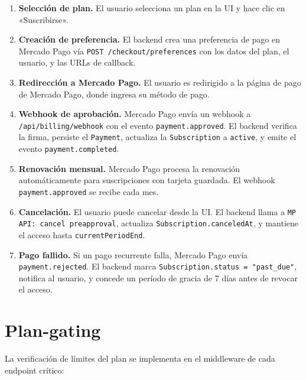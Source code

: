 \documentclass[10pt,a4paper,oneside]{report}
\begin{document}
\begin{enumerate}[leftmargin=1.6em]
\item \textbf{Selección de plan.} El usuario selecciona un plan en la UI y hace clic en «Suscribirse».
\item \textbf{Creación de preferencia.} El backend crea una preferencia de pago en Mercado Pago vía \texttt{POST /checkout/preferences} con los datos del plan, el usuario, y las URLs de callback.
\item \textbf{Redirección a Mercado Pago.} El usuario es redirigido a la página de pago de Mercado Pago, donde ingresa su método de pago.
\item \textbf{Webhook de aprobación.} Mercado Pago envía un webhook a \texttt{/api/billing/webhook} con el evento \texttt{payment.approved}. El backend verifica la firma, persiste el \texttt{Payment}, actualiza la \texttt{Subscription} a \texttt{active}, y emite el evento \texttt{payment.completed}.
\item \textbf{Renovación mensual.} Mercado Pago procesa la renovación automáticamente para suscripciones con tarjeta guardada. El webhook \texttt{payment.approved} se recibe cada mes.
\item \textbf{Cancelación.} El usuario puede cancelar desde la UI. El backend llama a \texttt{MP API: cancel preapproval}, actualiza \texttt{Subscription.canceledAt}, y mantiene el acceso hasta \texttt{currentPeriodEnd}.
\item \textbf{Pago fallido.} Si un pago recurrente falla, Mercado Pago envía \texttt{payment.rejected}. El backend marca \texttt{Subscription.status = "past\_due"}, notifica al usuario, y concede un período de gracia de 7 días antes de revocar el acceso.
\end{enumerate}

\section{Plan-gating}
La verificación de límites del plan se implementa en el middleware de cada endpoint crítico:
\end{document}
